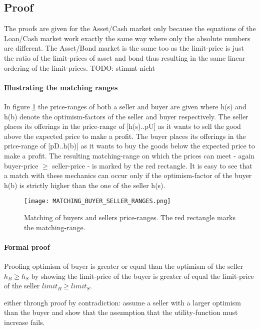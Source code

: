 \documentclass[Bachelorarbeit.tex]{subfiles}
\begin{document}
\subsection{Proof}
The proofs are given for the Asset/Cash market only because the equations of the Loan/Cash market work exactly the same way where only the absolute numbers are different. The Asset/Bond market is the same too as the limit-price is just the ratio of the limit-prices of asset and bond thus resulting in the same linear ordering of the limit-prices. TODO: stimmt nicht

\paragraph{Illustrating the matching ranges}
In figure \ref{fig:MATCHING_BUYER_SELLER_RANGES} the price-ranges of both a seller and buyer are given where h(s) and h(b) denote the optimism-factors of the seller and buyer respectively. The seller places its offerings in the price-range of [h(s)..pU] as it wants to sell the good above the expected price to make a profit. The buyer places its offerings in the price-range of [pD..h(b)] as it wants to buy the goods below the expected price to make a profit. The resulting matching-range on which the prices can meet - again buyer-price $\geq$ seller-price - is marked by the red rectangle. It is easy to see that a match with these mechanics can occur only if the optimism-factor of the buyer h(b) is strictly higher than the one of the seller h(s).

\begin{figure}[H]
	\centering
  \texttt{[image: MATCHING\_BUYER\_SELLER\_RANGES.png]}
  	\caption{Matching of buyers and sellers price-ranges. The red rectangle marks the matching-range.}
	\label{fig:MATCHING_BUYER_SELLER_RANGES}
\end{figure}


\paragraph{Formal proof}
Proofing optimism of buyer is greater or equal than the optimism of the seller $h_B \geq h_S$ by showing the limit-price of the buyer is greater of equal the limit-price of the seller $limit_B \geq limit_S$.

either through proof by contradiction: assume a seller with a larger optimism than the buyer and show that the assumption that the utility-function must increase fails.
\end{document}
